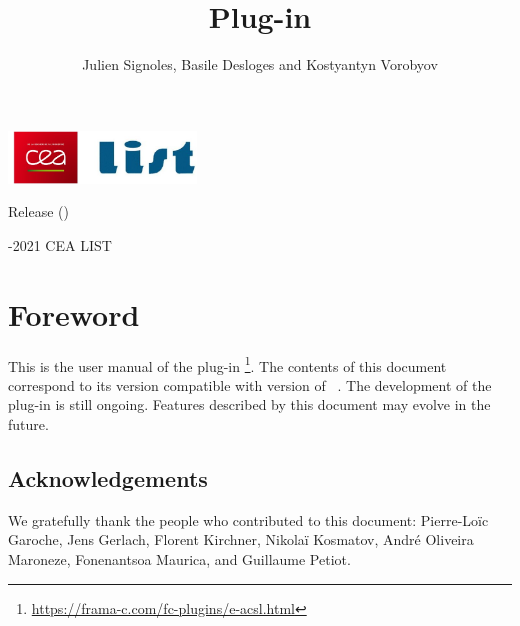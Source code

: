 \documentclass[web]{frama-c-book}
\begin{document}

\begin{titlepage}
\begin{flushleft}
\includegraphics[height=14mm]{cealistlogo.jpg}
\end{flushleft}
\vfill
\title{\eacsl Plug-in}{Release \eacslpluginversion (\eacslplugincodename)
 }
\author{Julien Signoles, Basile Desloges and Kostyantyn Vorobyov}
\begin{center}
\fcaffiliationen
\end{center}
\vfill
\begin{flushleft}
  -2021 CEA LIST
\end{flushleft}
\end{titlepage}

\tableofcontents


\chapter*{Foreword}
\markright{}

This is the user manual of the \framac plug-in
\eacsl\footnote{\url{https://frama-c.com/fc-plugins/e-acsl.html}}. The contents
of this document correspond to its version \eacslpluginversion compatible with
\fcversion version of \framac~\cite{userman,fac15}.  The development of
the \eacsl plug-in is still ongoing.  Features described by this document may
evolve in the future.

\section*{Acknowledgements}

We gratefully thank the people who contributed to this document:
Pierre-Lo\"ic Garoche, Jens Gerlach, Florent Kirchner, Nikola\"i Kosmatov,
Andr\'e Oliveira Maroneze, Fonenantsoa Maurica, and Guillaume Petiot.

\end{document}
